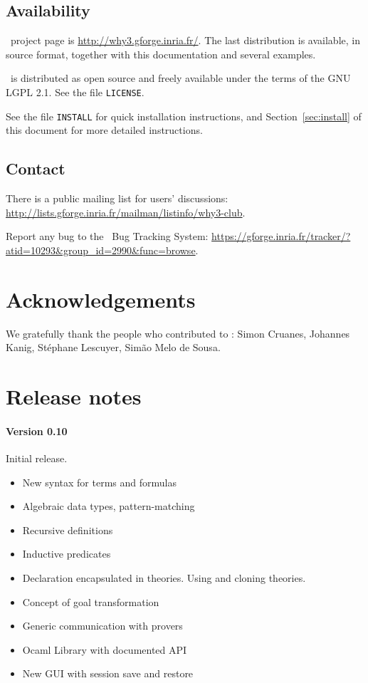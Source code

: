 \documentclass[a4paper,11pt,twoside,openright]{memoir}
\begin{document}
\subsection*{Availability}

\why\ project page is \url{http://why3.gforge.inria.fr/}.
The last distribution is available, in source format, together with
this documentation and several examples.

\why\ is distributed as open source and freely available under the
terms of the GNU LGPL 2.1. See the file \texttt{LICENSE}.

See the file \texttt{INSTALL} for quick installation instructions, and
Section~\ref{sec:install} of this document for more detailed
instructions.

\subsection*{Contact}

There is a public mailing list for users' discussions:
\url{http://lists.gforge.inria.fr/mailman/listinfo/why3-club}.

Report any bug to the \why\ Bug Tracking System:
\url{https://gforge.inria.fr/tracker/?atid=10293&group_id=2990&func=browse}.


\section*{Acknowledgements}

We gratefully thank the people who contributed to \why: Simon Cruanes,
Johannes Kanig, St\'ephane Lescuyer, Sim\~ao Melo de Sousa.

\section*{Release notes}

\paragraph{Version 0.10}
Initial release. 
\begin{itemize}
\item New syntax for terms and formulas
\item Algebraic data types, pattern-matching
\item Recursive definitions
\item Inductive predicates
\item Declaration encapsulated in theories. Using and cloning theories.
\item Concept of goal transformation
\item Generic communication with provers
\item Ocaml Library with documented API
\item New GUI with session save and restore
\end{itemize}
\cleardoublepage
\end{document}
